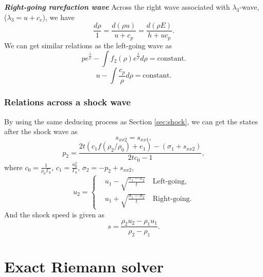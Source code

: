 \documentclass{article}
\numberwithin{equation}{section}
\numberwithin{table}{section}
\begin{document}
\emph{\textbf{Right-going rarefaction wave} }
Across the right wave associated with $\lambda_3$-wave, ($\lambda_3=u+c_e$), we have
\begin{equation}
  \frac{d\rho}{1} = \frac{d(\rho u)}{u+c_p} = \frac{d(\rho E)}{h+uc_p}.
\end{equation}
We can get  similar  relations  as the left-going wave as
\begin{equation}\label{eq:p_rhopR}
  p e^{\frac{\lambda}{\rho}} - \int f_2(\rho) e^{\frac{\lambda}{\rho}}d\rho = \text{constant}.
\end{equation}
\begin{equation}\label{eq:u_rhopR}
  u-\int\frac{c_p}{\rho} d\rho = \text{constant}.
\end{equation}

\subsubsection{Relations across  a shock wave}\label{sec:shockp}
By using the same deducing process as Section \ref{sec:shock}, we can get the states after the shock wave as
\begin{equation}
  s_{xx2} = s_{xx1},
\end{equation}
\begin{equation}\label{eq:shockp}
  p_2= \frac{2t(c_1f(\rho_2/\rho_0)+e_1)-(\sigma_1+s_{xx2})}{2tc_0-1},
\end{equation}
where $c_0 = \frac{1}{\rho_0\Gamma_0}$, $c_1 = \frac{a_0^2}{\Gamma_0}$, $\sigma_2 = -p_2 +s_{xx2}$,
\begin{equation}\label{eq:shockup}
  u_2 = \left\{ \begin{aligned}
	 & u_1 - \sqrt{\frac{\sigma_1- \sigma_2}{t}} \quad \text{Left-going}, \\
	 & u_1 + \sqrt{\frac{\sigma_1- \sigma_2}{t}} \quad \text{Right-going}.
	\end{aligned}
	\right.
  \end{equation}
And the shock speed is given as
\begin{equation}
  s = \frac{\rho_2u_2-\rho_1u_1}{\rho_2-\rho_1}.
\end{equation}


\section{Exact Riemann solver} %
\end{document}
